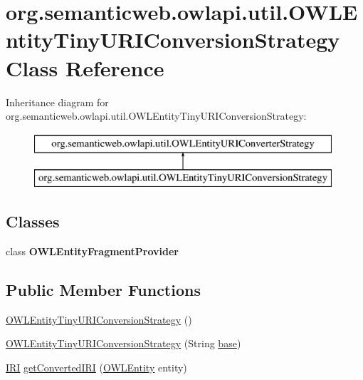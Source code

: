 \hypertarget{classorg_1_1semanticweb_1_1owlapi_1_1util_1_1_o_w_l_entity_tiny_u_r_i_conversion_strategy}{\section{org.\-semanticweb.\-owlapi.\-util.\-O\-W\-L\-Entity\-Tiny\-U\-R\-I\-Conversion\-Strategy Class Reference}
\label{classorg_1_1semanticweb_1_1owlapi_1_1util_1_1_o_w_l_entity_tiny_u_r_i_conversion_strategy}
}
Inheritance diagram for org.\-semanticweb.\-owlapi.\-util.\-O\-W\-L\-Entity\-Tiny\-U\-R\-I\-Conversion\-Strategy\-:\begin{figure}[H]
\begin{center}
\leavevmode
\includegraphics[height=2.000000cm]{classorg_1_1semanticweb_1_1owlapi_1_1util_1_1_o_w_l_entity_tiny_u_r_i_conversion_strategy}
\end{center}
\end{figure}
\subsection*{Classes}
\begin{DoxyCompactItemize}
\item 
class {\bfseries O\-W\-L\-Entity\-Fragment\-Provider}
\end{DoxyCompactItemize}
\subsection*{Public Member Functions}
\begin{DoxyCompactItemize}
\item 
\hyperlink{classorg_1_1semanticweb_1_1owlapi_1_1util_1_1_o_w_l_entity_tiny_u_r_i_conversion_strategy_adfdd7f3b729f455f9a04d1849e7f59d3}{O\-W\-L\-Entity\-Tiny\-U\-R\-I\-Conversion\-Strategy} ()
\item 
\hyperlink{classorg_1_1semanticweb_1_1owlapi_1_1util_1_1_o_w_l_entity_tiny_u_r_i_conversion_strategy_a8e3e6c3bf0c3ab8a09318f9d035109f1}{O\-W\-L\-Entity\-Tiny\-U\-R\-I\-Conversion\-Strategy} (String \hyperlink{classorg_1_1semanticweb_1_1owlapi_1_1util_1_1_o_w_l_entity_tiny_u_r_i_conversion_strategy_af2330d80d95c71ff6ef1bd36d2556d78}{base})
\item 
\hyperlink{classorg_1_1semanticweb_1_1owlapi_1_1model_1_1_i_r_i}{I\-R\-I} \hyperlink{classorg_1_1semanticweb_1_1owlapi_1_1util_1_1_o_w_l_entity_tiny_u_r_i_conversion_strategy_ab453a50e29f329d56ce6c23efd065baf}{get\-Converted\-I\-R\-I} (\hyperlink{interfaceorg_1_1semanticweb_1_1owlapi_1_1model_1_1_o_w_l_entity}{O\-W\-L\-Entity} entity)
\end{DoxyCompactItemize}
